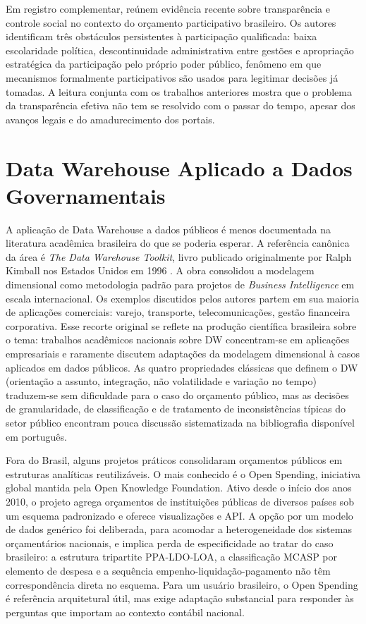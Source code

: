Em registro complementar,  reúnem evidência recente sobre transparência e controle social no contexto do orçamento participativo brasileiro. Os autores identificam três obstáculos persistentes à participação qualificada: baixa escolaridade política, descontinuidade administrativa entre gestões e apropriação estratégica da participação pelo próprio poder público, fenômeno em que mecanismos formalmente participativos são usados para legitimar decisões já tomadas. A leitura conjunta com os trabalhos anteriores mostra que o problema da transparência efetiva não tem se resolvido com o passar do tempo, apesar dos avanços legais e do amadurecimento dos portais.

\section{Data Warehouse Aplicado a Dados Governamentais}

A aplicação de Data Warehouse a dados públicos é menos documentada na literatura acadêmica brasileira do que se poderia esperar. A referência canônica da área é \textit{The Data Warehouse Toolkit}, livro publicado originalmente por Ralph Kimball nos Estados Unidos em 1996 \cite{kimball2013data}. A obra consolidou a modelagem dimensional como metodologia padrão para projetos de \textit{Business Intelligence} em escala internacional. Os exemplos discutidos pelos autores partem em sua maioria de aplicações comerciais: varejo, transporte, telecomunicações, gestão financeira corporativa. Esse recorte original se reflete na produção científica brasileira sobre o tema: trabalhos acadêmicos nacionais sobre DW concentram-se em aplicações empresariais e raramente discutem adaptações da modelagem dimensional à casos aplicados em dados públicos. As quatro propriedades clássicas que definem o DW (orientação a assunto, integração, não volatilidade e variação no tempo) traduzem-se sem dificuldade para o caso do orçamento público, mas as decisões de granularidade, de classificação e de tratamento de inconsistências típicas do setor público encontram pouca discussão sistematizada na bibliografia disponível em português.

Fora do Brasil, alguns projetos práticos consolidaram orçamentos públicos em estruturas analíticas reutilizáveis. O mais conhecido é o Open Spending, iniciativa global mantida pela Open Knowledge Foundation. Ativo desde o início dos anos 2010, o projeto agrega orçamentos de instituições públicas de diversos países sob um esquema padronizado e oferece visualizações e API. A opção por um modelo de dados genérico foi deliberada, para acomodar a heterogeneidade dos sistemas orçamentários nacionais, e implica perda de especificidade ao tratar do caso brasileiro: a estrutura tripartite PPA-LDO-LOA, a classificação MCASP por elemento de despesa e a sequência empenho-liquidação-pagamento não têm correspondência direta no esquema. Para um usuário brasileiro, o Open Spending é referência arquitetural útil, mas exige adaptação substancial para responder às perguntas que importam ao contexto contábil nacional.

